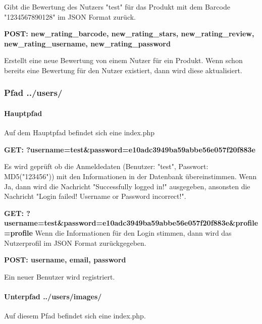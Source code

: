 \documentclass{scrartcl}
\begin{document}
\noindent Gibt die Bewertung des Nutzers "test" für das Produkt mit dem Barcode "1234567890128" im JSON Format zurück. \newline 

\noindent \textbf{POST: new\_rating\_barcode, new\_rating\_stars, \newline new\_rating\_review, new\_rating\_username, new\_rating\_password}

\noindent Erstellt eine neue Bewertung von einem Nutzer für ein Produkt. Wenn schon bereits eine Bewertung für den Nutzer existiert, dann wird diese aktualisiert.\newline  

\subsubsection{Pfad ../users/}

\paragraph{Hauptpfad} 
Auf dem Hauptpfad befindet sich eine index.php \newline 

\noindent \textbf{GET: ?username=test\&password=e10adc3949ba59abbe56e057f20f883e}

\noindent Es wird geprüft ob die Anmeldedaten (Benutzer: "test", Passwort: MD5("123456")) mit den Informationen in der Datenbank übereinstimmen. Wenn Ja, dann wird die Nachricht "Successfully logged in!" ausgegeben, ansonsten die Nachricht "Login failed! Username or Password incorrect!". \newline

\noindent \textbf{GET: ?username=test\&password=e10adc3949ba59abbe56e057f20f883e\&profile=profile}
Wenn die Informationen für den Login stimmen, dann wird das Nutzerprofil im JSON Format zurückgegeben. \newline

\noindent \textbf{POST: username, email, password}

\noindent Ein neuer Benutzer wird registriert. \newline 

\paragraph{Unterpfad ../users/images/}

Auf diesem Pfad befindet sich eine index.php. \newline 
\end{document}
